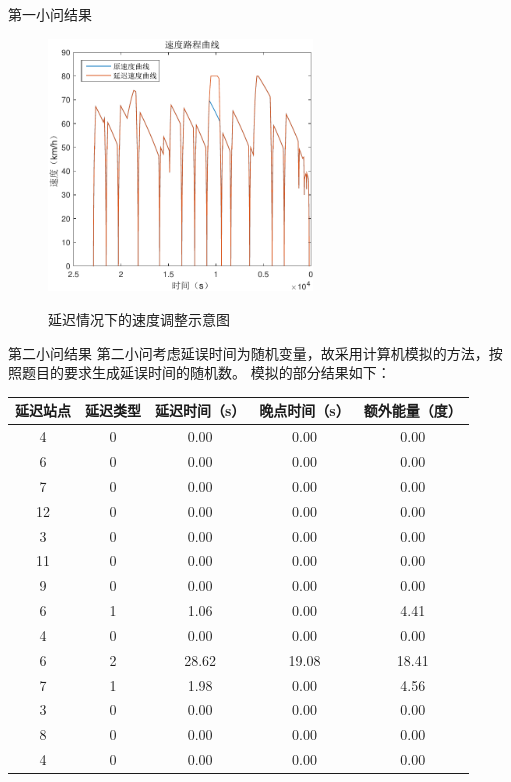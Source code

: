 \documentclass{beamer}
\begin{document}
\begin{frame}{第一小问结果}
\begin{figure}
  \centering
  \includegraphics[width=7cm]{fig/fig15/fig15.pdf}\\
  \caption{延迟情况下的速度调整示意图}
\end{figure}


\end{frame}

\begin{frame}{第二小问结果}
第二小问考虑延误时间为随机变量，故采用计算机模拟的方法，按照题目的要求生成延误时间的随机数。
模拟的部分结果如下：
\begin{table}\tiny
  \centering
  \begin{tabular}{|c|c|c|c|c|}
     \hline
    延迟站点&	延迟类型&	延迟时间（s）&	晚点时间（s）&	额外能量（度） \\
    \hline
    4&	0&	0.00&	0.00&	0.00\\
    6&	0&	0.00&	0.00&	0.00\\
    7&	0&	0.00&	0.00&	0.00\\
    12&	0&	0.00&	0.00&	0.00\\
    3&	0&	0.00&	0.00&	0.00\\
    11&	0&	0.00&	0.00&	0.00\\
    9&	0&	0.00&	0.00&	0.00\\
    6&	1&	1.06&	0.00&	4.41\\
    4&	0&	0.00&	0.00&	0.00\\
    6&	2&	28.62&	19.08&	18.41\\
    7&	1&	1.98&	0.00&	4.56\\
    3&	0&	0.00&	0.00&	0.00\\
    8&	0&	0.00&	0.00&	0.00\\
    4&	0&	0.00&	0.00&	0.00\\
     \hline
   \end{tabular}
\end{table}


\end{frame}
\end{document}
